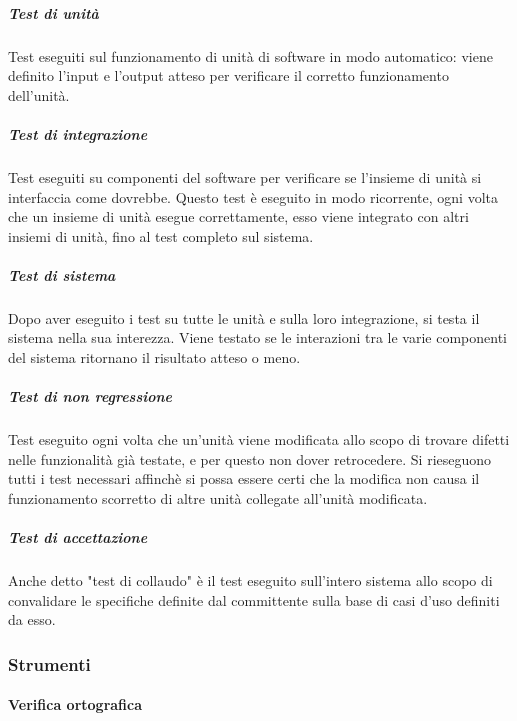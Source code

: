             \subparagraph*{Test di unità}
				Test eseguiti sul funzionamento di unità di software in modo automatico: viene definito l'input e l'output atteso per verificare il corretto funzionamento dell'unità.
            \subparagraph*{Test di integrazione}
				Test eseguiti su componenti del software per verificare se l'insieme di unità si interfaccia come dovrebbe. Questo test è eseguito in modo ricorrente, ogni volta che un insieme di unità esegue correttamente, esso viene integrato con altri insiemi di unità, fino al test completo sul sistema.
            \subparagraph*{Test di sistema}
				Dopo aver eseguito i test su tutte le unità e sulla loro integrazione, si testa il sistema nella sua interezza. Viene testato se le interazioni tra le varie componenti del sistema ritornano il risultato atteso o meno.
            \subparagraph*{Test di non regressione}
				Test eseguito ogni volta che un'unità viene modificata allo scopo di trovare difetti nelle funzionalità già testate, e per questo non dover retrocedere. Si rieseguono tutti i test necessari affinchè si possa essere certi che la modifica non causa il funzionamento scorretto di altre unità collegate all'unità modificata.
            \subparagraph*{Test di accettazione}   
				Anche detto "test di collaudo" è il test eseguito sull'intero sistema allo scopo di convalidare le specifiche definite dal committente sulla base di casi d'uso definiti da esso.

    \subsubsection{Strumenti}
        \paragraph{Verifica ortografica}
    